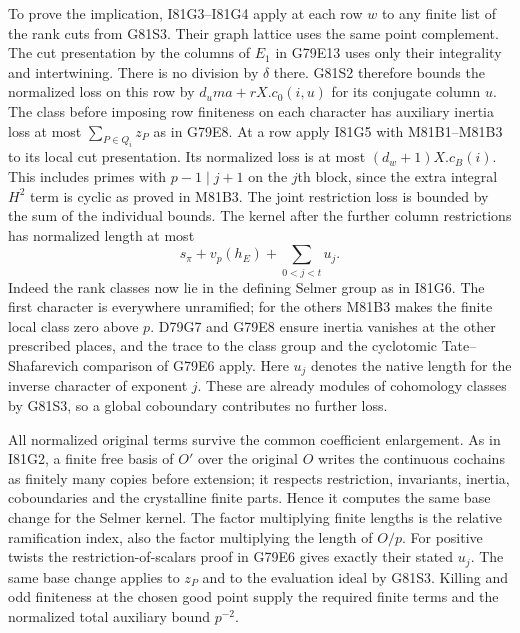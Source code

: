 To prove the implication, I81G3--I81G4 apply at each row $w$
to any finite list of the rank cuts from G81S3. Their graph
lattice uses the same point complement. The cut presentation by
the columns of $E_1$ in G79E13 uses only their integrality and
intertwining. There is no division by $\delta$ there. G81S2
therefore bounds the normalized loss on this row by
$d_um a+rX.c_0(i,u)$ for its conjugate column $u$.
The class before imposing row finiteness on each character has
auxiliary inertia loss at most $\sum_{P\in Q_i}z_P$ as in G79E8.
At a row apply I81G5 with M81B1--M81B3 to its local cut
presentation. Its normalized loss is at most $(d_w+1)X.c_B(i)$.
This includes primes with $p-1\mid j+1$ on the $j$th block,
since the extra integral $H^2$ term is cyclic as proved in M81B3.
The joint restriction loss is bounded by the sum of the individual
bounds. The kernel after the further column restrictions has
normalized length at most
\[
                    s_\pi+v_p(h_E)+\sum_{0<j<t}u_j .
\]
Indeed the rank classes now lie in the defining Selmer group
as in I81G6. The first character is everywhere unramified;
for the others M81B3 makes the finite local class zero above $p$.
D79G7 and G79E8 ensure inertia vanishes at the other prescribed
places, and the trace to the class group and the cyclotomic
Tate--Shafarevich comparison of G79E6 apply. Here $u_j$ denotes
the native length for the inverse character of exponent $j$.
These are already modules of cohomology classes by G81S3, so a
global coboundary contributes no further loss.

All normalized original terms survive the common coefficient
enlargement. As in I81G2, a finite free basis of $O'$ over the
original $O$ writes the continuous cochains as finitely many
copies before extension; it respects restriction, invariants,
inertia, coboundaries and the crystalline finite parts. Hence
it computes the same base change for the Selmer kernel.
The factor multiplying finite lengths is the relative ramification
index, also the factor multiplying the length of $O/p$.
For positive twists the restriction-of-scalars proof in G79E6
gives exactly their stated $u_j$. The same base change applies
to $z_P$ and to the evaluation ideal by G81S3. Killing and odd
finiteness at the chosen good point supply the required finite
terms and the normalized total auxiliary bound $p^{-2}$.

